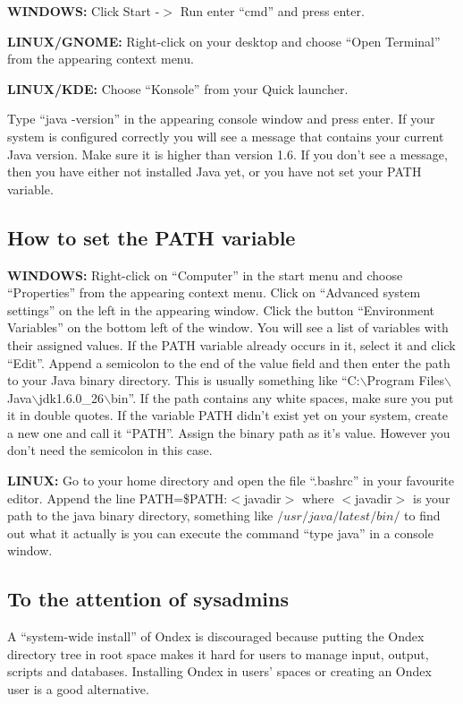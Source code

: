 \textbf{WINDOWS: }
Click Start -$>$ Run enter ``cmd'' and press enter. 

\noindent\textbf{LINUX/GNOME: }
Right-click on your desktop and choose ``Open Terminal'' from the appearing context menu.

\noindent\textbf{LINUX/KDE: }
Choose ``Konsole'' from your Quick launcher.

Type ``java -version'' in the appearing console window and press enter.
If your system is configured correctly you will see a message that contains your current Java version. Make sure it is higher than version 1.6.
If you don't see a message, then you have either not installed Java yet, or you have not set your PATH variable.

\subsection{How to set the PATH variable}
\textbf{WINDOWS: }
Right-click on ``Computer'' in the start menu and choose ``Properties'' from the appearing context menu. 
Click on ``Advanced system settings'' on the left in the appearing window. 
Click the button ``Environment Variables'' on the bottom left of the window. 
You will see a list of variables with their assigned values. 
If the PATH variable already occurs in it, select it and click ``Edit''. 
Append a semicolon to the end of the value field and then enter the path to your Java binary directory. 
This is usually something like ``C:$\backslash$Program Files$\backslash$Java$\backslash$jdk1.6.0\_26$\backslash$bin''.
If the path contains any white spaces, make sure you put it in double quotes. 
If the variable PATH didn't exist yet on your system, create a new one and call it ``PATH''. 
Assign the binary path as it's value. However you don't need the semicolon in this case.

\noindent\textbf{LINUX: }
Go to your home directory and open the file ``.bashrc'' in your favourite editor. 
Append the line PATH=\$PATH:$<$javadir$>$ where $<$javadir$>$ is your path to the java binary directory, 
something like $/usr/java/latest/bin/$ to find out what it actually is you can execute the command ``type java'' in a console window. 

\subsection{To the attention of sysadmins}
A ``system-wide install'' of Ondex is discouraged because putting the Ondex directory tree 
in root space makes it hard for users to manage input, output, scripts and databases. 
Installing Ondex in users' spaces or creating an Ondex user is a good alternative. 

